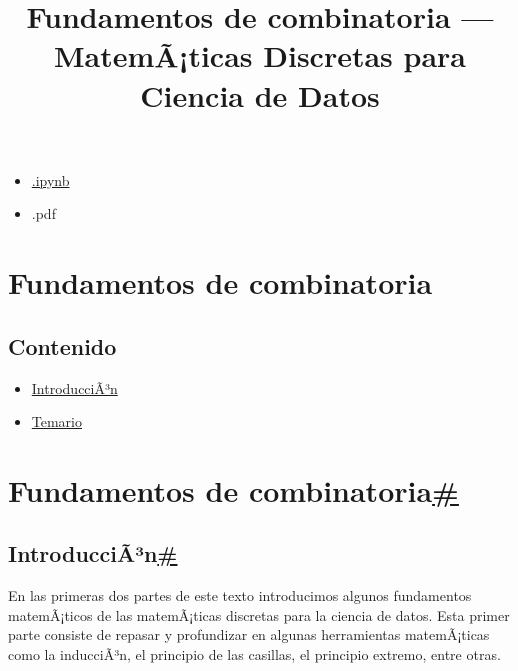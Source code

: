 \documentclass[
]{article}
\title{Fundamentos de combinatoria --- MatemÃ¡ticas Discretas para
Ciencia de Datos}
\author{}
\date{}
\providecommand{\tightlist}{%
  \setlength{\itemsep}{0pt}\setlength{\parskip}{0pt}}
\begin{document}
\maketitle

\label{main-content}
{}

\emph{}

\begin{itemize}
\tightlist
\item
  \href{../_sources/P1/IntroCombinatoria.ipynb}{{ \emph{} } {.ipynb}}
\item
  { \emph{} } {.pdf}
\end{itemize}

{ \emph{} }

{}

\label{jb-print-docs-body}
\section{Fundamentos de combinatoria}\label{fundamentos-de-combinatoria}

\label{print-main-content}
\label{jb-print-toc}
\subsection{Contenido}\label{contenido}

\begin{itemize}
\tightlist
\item
  \hyperref[introduccion]{IntroducciÃ³n}
\item
  \hyperref[temario]{Temario}
\end{itemize}

\label{searchbox}

\label{fundamentos-de-combinatoria}
\section{\texorpdfstring{Fundamentos de
combinatoria\hyperref[fundamentos-de-combinatoria]{\#}}{Fundamentos de combinatoria\#}}\label{fundamentos-de-combinatoria-1}

\label{introduccion}
\subsection{\texorpdfstring{IntroducciÃ³n\hyperref[introduccion]{\#}}{IntroducciÃ³n\#}}\label{introducciuxe3uxb3n}

En las primeras dos partes de este texto introducimos algunos
fundamentos matemÃ¡ticos de las matemÃ¡ticas discretas para la ciencia
de datos. Esta primer parte consiste de repasar y profundizar en algunas
herramientas matemÃ¡ticas como la inducciÃ³n, el principio de las
casillas, el principio extremo, entre otras.
\end{document}
